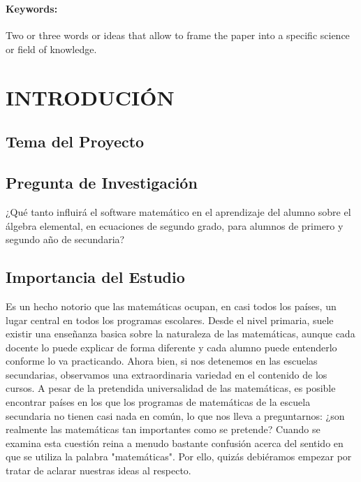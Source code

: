 \documentclass[a4paper,10pt]{report}
\begin{document}
{\


\paragraph{Keywords:} Two or three words or ideas that allow to frame the paper into a specific science or field of knowledge.







\newpage


\tableofcontents

\newpage



\section{\textbf{INTRODUCIÓN}}


%
\subsection{Tema del Proyecto}

\subsection{\textbf{Pregunta de Investigación}}
¿Qué tanto influirá el software matemático en el aprendizaje del alumno sobre el álgebra elemental, en ecuaciones de segundo grado, para alumnos de primero y segundo año de secundaria?

\subsection{Importancia del Estudio}
Es un hecho notorio que las matemáticas ocupan, en casi todos los países, un lugar central en todos los programas escolares. Desde el nivel primaria, suele existir una enseñanza basica sobre la naturaleza de las matemáticas, aunque cada docente lo puede explicar de forma diferente y cada alumno puede entenderlo conforme lo va practicando. Ahora bien, si nos detenemos en las escuelas secundarias, observamos una extraordinaria variedad en el contenido de los cursos. A pesar de la pretendida universalidad de las matemáticas, es posible encontrar países en los que los programas de matemáticas de la escuela secundaria no tienen casi nada en común, lo que nos lleva a preguntarnos: ¿son realmente las matemáticas tan importantes como se pretende? Cuando se examina esta cuestión reina a menudo bastante confusión acerca del sentido en que se utiliza la palabra "matemáticas". Por ello, quizás debiéramos empezar por tratar de aclarar nuestras ideas al respecto. 

}
\end{document}
